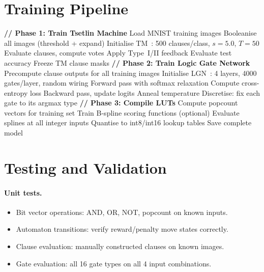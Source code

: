 \section{Training Pipeline}
\label{sec:training-pipeline}

\begin{algorithm}[htbp]
\caption{Complete training pipeline.}
\label{alg:full-training}
\begin{algorithmic}[1]
  \State \textbf{// Phase 1: Train Tsetlin Machine}
  \State Load MNIST training images
  \State Booleanise all images (threshold + expand)
  \State Initialise TM~\cite{granmo2018tsetlin}: 500 clauses/class, $s = 5.0$, $T = 50$
      \State Evaluate clauses, compute votes
      \State Apply Type~I/II feedback
    \EndFor
    \State Evaluate test accuracy
  \EndFor
  \State Freeze TM clause masks
  \Statex
  \State \textbf{// Phase 2: Train Logic Gate Network}
  \State Precompute clause outputs for all training images
  \State Initialise LGN~\cite{petersen2022difflogic}: 4 layers, 4000 gates/layer, random wiring
      \State Forward pass with softmax relaxation
      \State Compute cross-entropy loss
      \State Backward pass, update logits
    \EndFor
    \State Anneal temperature
  \EndFor
  \State Discretise: fix each gate to its argmax type
  \Statex
  \State \textbf{// Phase 3: Compile LUTs}
  \State Compute popcount vectors for training set
  \State Train B-spline scoring functions (optional)
  \State Evaluate splines at all integer inputs
  \State Quantise to int8/int16 lookup tables
  \State Save complete model
\end{algorithmic}
\end{algorithm}


\section{Testing and Validation}
\label{sec:testing}

\paragraph{Unit tests.}
\begin{itemize}
  \item Bit vector operations: AND, OR, NOT, popcount on known inputs.
  \item Automaton transitions: verify reward/penalty move states
    correctly.
  \item Clause evaluation: manually constructed clauses on known
    images.
  \item Gate evaluation: all 16 gate types on all 4 input
    combinations.
\end{itemize}

